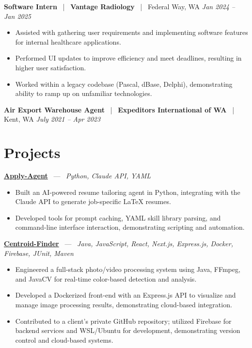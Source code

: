 \documentclass[10pt, letterpaper]{article}
\newcommand{\jobhead}[4]{%
  \vspace{5pt}%
  {\bfseries\color{dark}#1}%
  ~{\color{light}|}~%
  {\bfseries\color{navy}#2}%
  ~{\color{light}|}~%
  {\color{light}#3}%
  \hfill{\color{light}\small\textit{#4}}\\[-2pt]%
}
\newcommand{\projhead}[3]{%
  \vspace{5pt}%
  {\bfseries\color{dark}\href{#2}{#1}}%
  ~{\color{light}---}~%
  {\color{light}\small\textit{#3}}\\[-2pt]%
}
\begin{document}
\jobhead{Software Intern}{Vantage Radiology}{Federal Way, WA}{Jan 2024 – Jan 2025}
\begin{itemize}
  \item Assisted with gathering user requirements and implementing software features for internal healthcare applications.
  \item Performed UI updates to improve efficiency and meet deadlines, resulting in higher user satisfaction.
  \item Worked within a legacy codebase (Pascal, dBase, Delphi), demonstrating ability to ramp up on unfamiliar technologies.
\end{itemize}

\jobhead{Air Export Warehouse Agent}{Expeditors International of WA}{Kent, WA}{July 2021 – Apr 2023}

\section{Projects}

\projhead{Apply-Agent}{https://github.com/timmyd4/apply-agent}{Python, Claude API, YAML}
\begin{itemize}
  \item Built an AI-powered resume tailoring agent in Python, integrating with the Claude API to generate job-specific LaTeX resumes.
  \item Developed tools for prompt caching, YAML skill library parsing, and command-line interface interaction, demonstrating scripting and automation.
\end{itemize}

\projhead{Centroid-Finder}{https://github.com/xavierb117/centroid-finder}{Java, JavaScript, React, Next.js, Express.js, Docker, Firebase, JUnit, Maven}
\begin{itemize}
  \item Engineered a full-stack photo/video processing system using Java, FFmpeg, and JavaCV for real-time color-based detection and analysis.
  \item Developed a Dockerized front-end with an Express.js API to visualize and manage image processing results, demonstrating cloud-based integration.
  \item Contributed to a client's private GitHub repository; utilized Firebase for backend services and WSL/Ubuntu for development, demonstrating version control and cloud-based systems.
\end{itemize}
\end{document}
